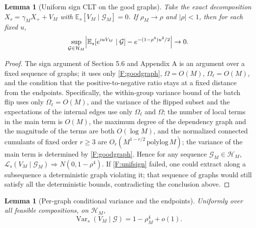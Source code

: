 \documentclass[a4paper,11pt]{article}
\newtheorem{lemma}[theorem]{Lemma}
\numberwithin{equation}{section}
\newcommand{\E}{\mathbb E}
\newcommand{\Var}{\operatorname{Var}}
\begin{document}
\begin{lemma}[Uniform sign CLT on the good graphs]\label{F:lem:unifsign}
Take the exact decomposition $X_s=\gamma_MX_++V_M$ with $\E_s[V_M\mid\mathcal G_M]=0$. If $\rho_M\to\rho$ and
$|\rho|<1$, then for each fixed $u$,
\begin{equation}
\sup_{\mathcal G\in\mathcal H_M}\Bigl|\E_s[e^{iuV_M}\mid\mathcal G]-e^{-(1-\rho^4)u^2/2}\Bigr|\to0.\label{F:unifsign}
\end{equation}
\end{lemma}

\begin{proof}
The sign argument of Section 5.6 and Appendix A is an argument over a fixed sequence of graphs; it uses only
\eqref{F:goodgraph}, $\Omega=O(M)$, $\Omega_\ell=O(M)$, and the condition that the positive-to-negative ratio
stays at a fixed distance from the endpoints. Specifically, the within-group variance bound of the batch flip
uses only $\Omega_\ell=O(M)$, and the variance of the flipped subset and the expectations of the internal
edges use only $\Omega_\ell$ and $\Omega$; the number of local terms in the main term is $O(M)$, the maximum
degree of the dependency graph and the magnitude of the terms are both $O(\log M)$, and the normalized
connected cumulants of fixed order $r\ge3$ are $O_r(M^{1-r/2}\,\mathrm{polylog}\,M)$; the variance of the main
term is determined by \eqref{F:goodgraph}. Hence for any sequence $\mathcal G_M\in\mathcal H_M$,
$\mathcal L_s(V_M\mid\mathcal G_M)\Rightarrow N(0,1-\rho^4)$. If \eqref{F:unifsign} failed, one could extract
along a subsequence a deterministic graph violating it; that sequence of graphs would still satisfy all the
deterministic bounds, contradicting the conclusion above.
\end{proof}

\begin{lemma}[Per-graph conditional variance and the endpoints]\label{F:lem:endpoint}
Uniformly over all feasible compositions, on $\mathcal H_M$,
\begin{equation}
\Var_s(V_M\mid\mathcal G)=1-\rho_M^4+o(1).\label{F:pergraphvar}
\end{equation}
\end{lemma}
\end{document}
